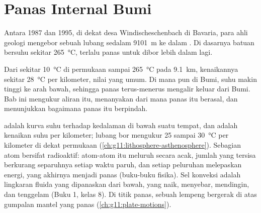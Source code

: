 \chapter{Panas Internal Bumi}\label{ch:g12:internal-heat}

Antara 1987 dan 1995, di dekat desa Windischeschenbach di Bavaria, para ahli
geologi mengebor sebuah lubang sedalam \qty{9101}{m} ke dalam . Di
dasarnya batuan bersuhu sekitar \qty{265}{\celsius}, terlalu panas untuk dibor
lebih dalam lagi.

Dari sekitar \qty{10}{\celsius} di permukaan sampai \qty{265}{\celsius} pada
\qty{9.1}{km}, kenaikannya sekitar \qty{28}{\celsius} per kilometer, nilai yang
umum. Di mana pun di Bumi, suhu makin tinggi ke arah bawah, sehingga panas
terus-menerus mengalir keluar dari Bumi. Bab ini mengukur aliran itu,
menanyakan dari mana panas itu berasal, dan menunjukkan bagaimana panas itu
berpindah.

\begin{recall}
 adalah kurva suhu terhadap kedalaman di bawah suatu tempat, dan
 adalah kenaikan suhu per kilometer; lubang bor mengukur 25
sampai \qty{30}{\celsius} per kilometer di dekat permukaan
(\cref{ch:g11:lithosphere-asthenosphere}). Sebagian atom bersifat radioaktif:
atom-atom itu meluruh secara acak, jumlah yang tersisa berkurang separuhnya
setiap waktu paruh, dan setiap peluruhan melepaskan energi, yang akhirnya
menjadi panas (buku-buku fisika). Sel konveksi adalah lingkaran fluida yang
dipanaskan dari bawah, yang naik, menyebar, mendingin, dan tenggelam (Buku 1,
kelas 8). Di titik panas, sebuah lempeng bergerak di atas gumpalan mantel yang
panas (\cref{ch:g11:plate-motions}).
\end{recall}

